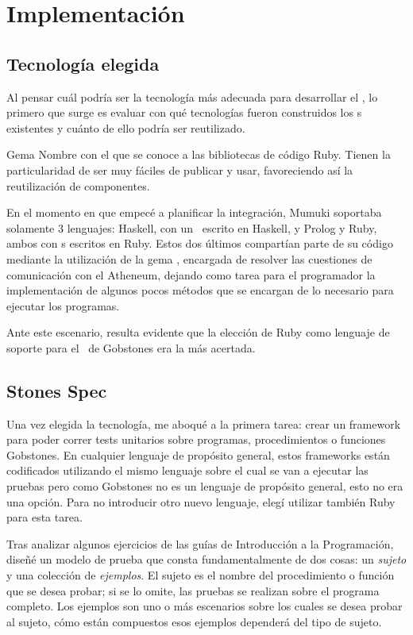 
\section{Implementación}

\subsection{Tecnología elegida}
Al pensar cuál podría ser la tecnología más adecuada para desarrollar el \runner, lo primero que surge es evaluar con qué tecnologías fueron construidos los \runner s existentes y cuánto de ello podría ser reutilizado.

\sepfootnotecontent
  {Gema}
  {Nombre con el que se conoce a las bibliotecas de código Ruby. Tienen la particularidad de ser muy fáciles de publicar y usar, favoreciendo así la reutilización de componentes.}

En el momento en que empecé a planificar la integración, Mumuki soportaba solamente 3 lenguajes: Haskell, con un \runner\ escrito en Haskell, y Prolog y Ruby, ambos con \runner s escritos en Ruby. Estos dos últimos compartían parte de su código mediante la utilización de la gema \mumukit, encargada de resolver las cuestiones de comunicación con el Atheneum, dejando como tarea para el programador la implementación de algunos pocos métodos que se encargan de lo necesario para ejecutar los programas.

Ante este escenario, resulta evidente que la elección de Ruby como lenguaje de soporte para el \runner\ de Gobstones era la más acertada.

\subsection{Stones Spec}
Una vez elegida la tecnología, me aboqué a la primera tarea: crear un framework para poder correr tests unitarios sobre programas, procedimientos o funciones Gobstones. En cualquier lenguaje de propósito general, estos frameworks están codificados utilizando el mismo lenguaje sobre el cual se van a ejecutar las pruebas pero como Gobstones no es un lenguaje de propósito general, esto no era una opción. Para no introducir otro nuevo lenguaje, elegí utilizar también Ruby para esta tarea.

Tras analizar algunos ejercicios de las guías de Introducción a la Programación, diseñé un modelo de prueba que consta fundamentalmente de dos cosas: un \emph{sujeto} y una colección de \emph{ejemplos}. El sujeto es el nombre del procedimiento o función que se desea probar; si se lo omite, las pruebas se realizan sobre el programa completo. Los ejemplos son uno o más escenarios sobre los cuales se desea probar al sujeto, cómo están compuestos esos ejemplos dependerá del tipo de sujeto.

